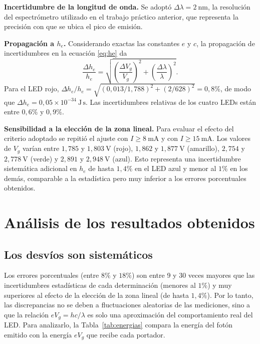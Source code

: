 \documentclass{article}
\newcommand{\Js}{\ \mathrm{J\,s}}
\begin{document}
\textbf{Incertidumbre de la longitud de onda.} Se adoptó $\Delta\lambda=2\ \mathrm{nm}$, la resolución del espectrómetro utilizado en el trabajo práctico anterior, que representa la precisión con que se ubica el pico de emisión.

\textbf{Propagación a $h_e$.} Considerando exactas las constantes $e$ y $c$, la propagación de incertidumbres en la ecuación \eqref{eq:he} da
\begin{equation}
    \frac{\Delta h_e}{h_e}=\sqrt{\left(\frac{\Delta V_g}{V_g}\right)^2+\left(\frac{\Delta\lambda}{\lambda}\right)^2}.
\end{equation}
Para el LED rojo, $\Delta h_e/h_e=\sqrt{(0,013/1,788)^2+(2/628)^2}=0,8\%$, de modo que $\Delta h_e=0,05\times10^{-34}\Js$. Las incertidumbres relativas de los cuatro LEDs están entre $0,6\%$ y $0,9\%$.

\textbf{Sensibilidad a la elección de la zona lineal.} Para evaluar el efecto del criterio adoptado se repitió el ajuste con $I\geq8\ \mathrm{mA}$ y con $I\geq15\ \mathrm{mA}$. Los valores de $V_g$ varían entre $1,785$ y $1,803\ \mathrm{V}$ (rojo), $1,862$ y $1,877\ \mathrm{V}$ (amarillo), $2,754$ y $2,778\ \mathrm{V}$ (verde) y $2,891$ y $2,948\ \mathrm{V}$ (azul). Esto representa una incertidumbre sistemática adicional en $h_e$ de hasta $1,4\%$ en el LED azul y menor al $1\%$ en los demás, comparable a la estadística pero muy inferior a los errores porcentuales obtenidos.

\section{Análisis de los resultados obtenidos}

\subsection{Los desvíos son sistemáticos}

Los errores porcentuales (entre $8\%$ y $18\%$) son entre 9 y 30 veces mayores que las incertidumbres estadísticas de cada determinación (menores al $1\%$) y muy superiores al efecto de la elección de la zona lineal (de hasta $1,4\%$). Por lo tanto, las discrepancias no se deben a fluctuaciones aleatorias de las mediciones, sino a que la relación $eV_g=hc/\lambda$ es solo una aproximación del comportamiento real del LED. Para analizarlo, la Tabla~\ref{tab:energias} compara la energía del fotón emitido con la energía $eV_g$ que recibe cada portador.
\end{document}

